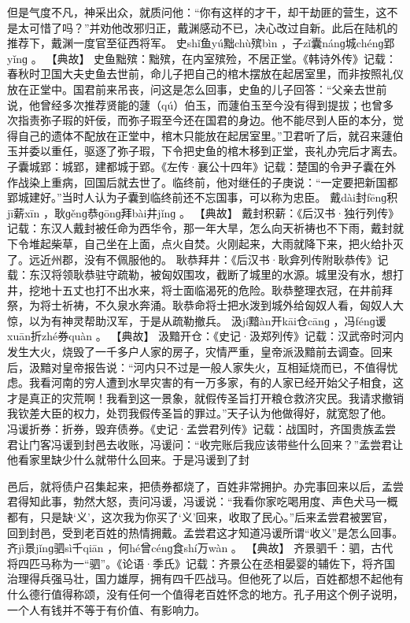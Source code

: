 \documentclass[12pt,UTF8]{ctexbook}
\begin{document}
但是气度不凡，神采出众，就质问他：“你有这样的才干，却干劫匪的营生，这不是太可惜了吗？”并劝他改邪归正，戴渊感动不已，决心改过自新。此后在陆机的推荐下，戴渊一度官至征西将军。
史shǐ鱼yú黜chù殡bìn
，子zǐ囊nánɡ城chénɡ郢yǐnɡ
。
【典故】
史鱼黜殡：黜殡，在内室殡殓，不居正堂。《韩诗外传》记载：春秋时卫国大夫史鱼去世前，命儿子把自己的棺木摆放在起居室里，而非按照礼仪放在正堂中。国君前来吊丧，问这是怎么回事，史鱼的儿子回答：“父亲去世前说，他曾经多次推荐贤能的蘧（qú）伯玉，而蘧伯玉至今没有得到提拔；也曾多次指责弥子瑕的奸佞，而弥子瑕至今还在国君的身边。他不能尽到人臣的本分，觉得自己的遗体不配放在正堂中，棺木只能放在起居室里。”卫君听了后，就召来蘧伯玉并委以重任，驱逐了弥子瑕，下令把史鱼的棺木移到正堂，丧礼办完后才离去。
子囊城郢：城郢，建都城于郢。《左传·襄公十四年》记载：楚国的令尹子囊在外作战染上重病，回国后就去世了。临终前，他对继任的子庚说：“一定要把新国都郢城建好。”当时人认为子囊到临终前还不忘国事，可以称为忠臣。
戴dài封fēnɡ积jī薪xīn
，耿ɡěnɡ恭ɡōnɡ拜bài井jǐnɡ
。
【典故】
戴封积薪：《后汉书·独行列传》记载：东汉人戴封被任命为西华令，那一年大旱，怎么向天祈祷也不下雨，戴封就下令堆起柴草，自己坐在上面，点火自焚。火刚起来，大雨就降下来，把火给扑灭了。远近州郡，没有不佩服他的。
耿恭拜井：《后汉书·耿弇列传附耿恭传》记载：东汉将领耿恭驻守疏勒，被匈奴围攻，截断了城里的水源。城里没有水，想打井，挖地十五丈也打不出水来，将士面临渴死的危险。耿恭整理衣冠，在井前拜祭，为将士祈祷，不久泉水奔涌。耿恭命将士把水泼到城外给匈奴人看，匈奴人大惊，以为有神灵帮助汉军，于是从疏勒撤兵。
汲jí黯àn开kāi仓cānɡ
，冯fénɡ谖xuān折zhé券quàn
。
【典故】
汲黯开仓：《史记·汲郑列传》记载：汉武帝时河内发生大火，烧毁了一千多户人家的房子，灾情严重，皇帝派汲黯前去调查。回来后，汲黯对皇帝报告说：“河内只不过是一般人家失火，互相延烧而已，不值得忧虑。我看河南的穷人遭到水旱灾害的有一万多家，有的人家已经开始父子相食，这才是真正的灾荒啊！我看到这一景象，就假传圣旨打开粮仓救济灾民。我请求撤销我钦差大臣的权力，处罚我假传圣旨的罪过。”天子认为他做得好，就宽恕了他。
冯谖折券：折券，毁弃债券。《史记·孟尝君列传》记载：战国时，齐国贵族孟尝君让门客冯谖到封邑去收账，冯谖问：“收完账后我应该带些什么回来？”孟尝君让他看家里缺少什么就带什么回来。于是冯谖到了封

邑后，就将债户召集起来，把债券都烧了，百姓非常拥护。办完事回来以后，孟尝君得知此事，勃然大怒，责问冯谖，冯谖说：“我看你家吃喝用度、声色犬马一概都有，只是缺‘义’，这次我为你买了‘义’回来，收取了民心。”后来孟尝君被罢官，回到封邑，受到老百姓的热情拥戴。孟尝君这才知道冯谖所谓“收义”是怎么回事。
齐jì景jǐnɡ驷sì千qiān
，何hé曾cénɡ食shí万wàn
。
【典故】
齐景驷千：驷，古代将四匹马称为一“驷”。《论语·季氏》记载：齐景公在丞相晏婴的辅佐下，将齐国治理得兵强马壮，国力雄厚，拥有四千匹战马。但他死了以后，百姓都想不起他有什么德行值得称颂，没有任何一个值得老百姓怀念的地方。孔子用这个例子说明，一个人有钱并不等于有价值、有影响力。
\end{document}
